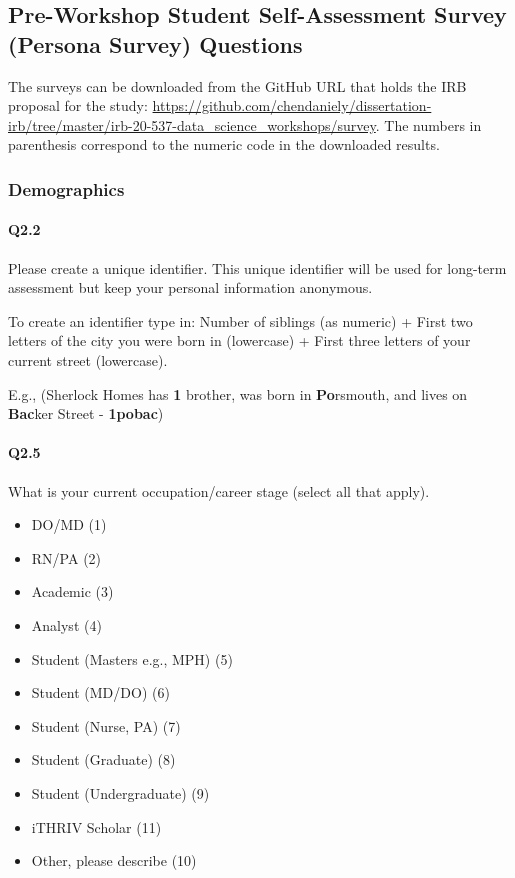 \documentclass[020-persona\_validation.tex]{subfiles}
\begin{document}
\subsection{Pre-Workshop Student Self-Assessment Survey (Persona Survey) Questions}
\label{sse:persona-survey-questions}

The surveys can be downloaded from the GitHub URL that holds the IRB proposal for the study:
\url{https://github.com/chendaniely/dissertation-irb/tree/master/irb-20-537-data\_science_workshops/survey}.
The numbers in parenthesis correspond to the numeric code in the downloaded results.

    \subsubsection{Demographics}

        \paragraph{Q2.2}

            Please create a unique identifier.
            This unique identifier will be used for long-term assessment but keep your personal information anonymous.

            To create an identifier type in:
            Number of siblings (as numeric) +
            First two letters of the city you were born in (lowercase) +
            First three letters of your current street (lowercase).

            E.g., (Sherlock Homes has \textbf{1} brother,
                was born in \textbf{Po}rsmouth,
                and lives on \textbf{Bac}ker Street - \textbf{1pobac})

        \paragraph{Q2.5}

            What is your current occupation/career stage (select all that apply).

            \begin{itemize}
                \item DO/MD  (1)
                \item RN/PA  (2)
                \item Academic  (3)
                \item Analyst  (4)
                \item Student (Masters e.g., MPH)  (5)
                \item Student (MD/DO)  (6)
                \item Student (Nurse, PA)  (7)
                \item Student (Graduate)  (8)
                \item Student (Undergraduate)  (9)
                \item iTHRIV Scholar  (11)
                \item Other, please describe  (10)
            \end{itemize}
\end{document}
